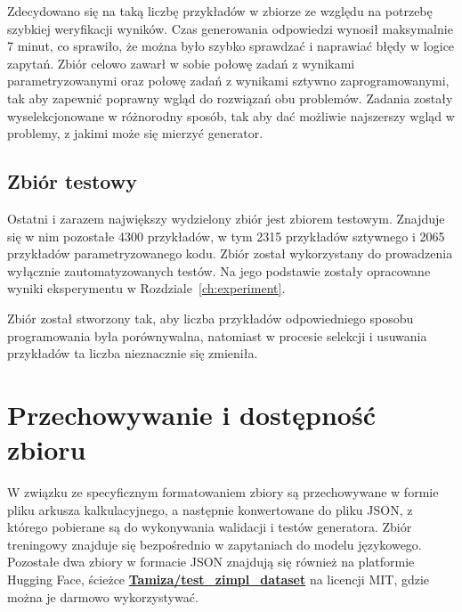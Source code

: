 Zdecydowano się na taką liczbę przykładów w zbiorze ze względu na potrzebę szybkiej weryfikacji wyników. Czas generowania odpowiedzi wynosił maksymalnie 7 minut, %
 co sprawiło, że można było szybko sprawdzać i naprawiać błędy w logice zapytań. Zbiór celowo zawarł w sobie połowę zadań z wynikami parametryzowanymi oraz połowę zadań z wynikami sztywno zaprogramowanymi, tak aby zapewnić poprawny wgląd do rozwiązań obu problemów. Zadania zostały wyselekcjonowane w różnorodny sposób, tak aby dać możliwie najszerszy wgląd w problemy, z jakimi może się mierzyć generator. %

\subsection{Zbiór testowy}

Ostatni i zarazem największy wydzielony zbiór jest zbiorem testowym. Znajduje się w nim pozostałe 4300 przykładów, w tym 2315 przykładów sztywnego i 2065 przykładów parametryzowanego kodu. Zbiór został wykorzystany do prowadzenia wyłącznie zautomatyzowanych testów. Na jego podstawie zostały opracowane wyniki eksperymentu w Rozdziale~\ref{ch:experiment}.

Zbiór został stworzony tak, aby liczba przykładów odpowiedniego sposobu programowania była porównywalna, natomiast w procesie selekcji i usuwania przykładów ta liczba nieznacznie się zmieniła.

\section{Przechowywanie i dostępność zbioru}

W związku ze specyficznym formatowaniem zbiory są przechowywane w formie pliku arkusza kalkulacyjnego, a następnie konwertowane do pliku JSON, z którego pobierane są do wykonywania walidacji i testów generatora. Zbiór treningowy znajduje się bezpośrednio w zapytaniach do modelu językowego. Pozostałe dwa zbiory w formacie JSON znajdują się również na platformie Hugging Face, ścieżce \href{https://huggingface.co/datasets/Tamiza/test_zimpl_dataset}{\textbf{Tamiza/test\_zimpl\_dataset}} na licencji MIT, gdzie można je darmowo wykorzystywać. %